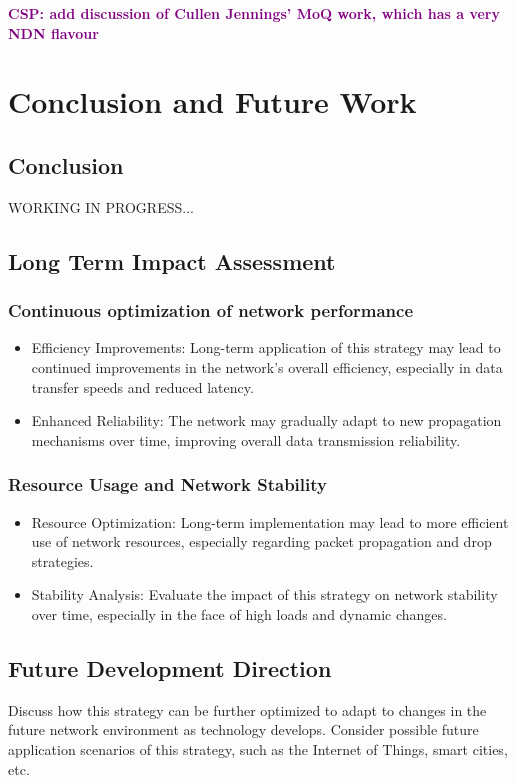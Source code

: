 \documentclass[conference]{IEEEtran}
\newcommand{\csp}[1]{\textbf{\textcolor{purple}{CSP: #1}}}
\begin{document}
\csp{add discussion of Cullen Jennings' MoQ work, which has a very NDN flavour}

\section{Conclusion and Future Work}
\subsection{Conclusion}
WORKING IN PROGRESS...
\subsection{Long Term Impact Assessment}
\subsubsection{Continuous optimization of network performance}
\begin{itemize}
    \item Efficiency Improvements: Long-term application of this strategy may lead to continued improvements in the network's overall efficiency, especially in data transfer speeds and reduced latency.
    \item Enhanced Reliability: The network may gradually adapt to new propagation mechanisms over time, improving overall data transmission reliability.
\end{itemize}

\subsubsection{Resource Usage and Network Stability}
\begin{itemize}
    \item Resource Optimization: Long-term implementation may lead to more efficient use of network resources, especially regarding packet propagation and drop strategies.
    \item Stability Analysis: Evaluate the impact of this strategy on network stability over time, especially in the face of high loads and dynamic changes.
\end{itemize}

\subsection{Future Development Direction}
Discuss how this strategy can be further optimized to adapt to changes in the future network environment as technology develops. Consider possible future application scenarios of this strategy, such as the Internet of Things, smart cities, etc.
\end{document}
